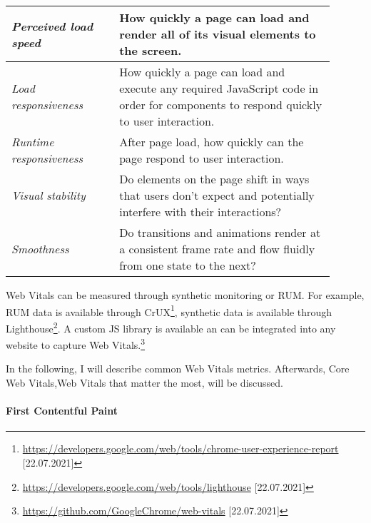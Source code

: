 
\begin{center}
\small
	\begin{tabular}{  p{0.3\linewidth} | p{0.6\linewidth}  }
	\textit{Perceived load speed} & How quickly a page can load and render all of its visual elements to the screen. \\
	\hline
	\textit{Load responsiveness} & How quickly a page can load and execute any required JavaScript code in order for components to respond quickly to user interaction. \\
	\hline
	\textit{Runtime responsiveness} & After page load, how quickly can the page respond to user interaction. \\
	\hline
	\textit{Visual stability} & Do elements on the page shift in ways that users don't expect and potentially interfere with their interactions? \\
	\hline
	\textit{Smoothness} & Do transitions and animations render at a consistent frame rate and flow fluidly from one state to the next? \\
	\end{tabular}
\end{center}



Web Vitals can be measured through synthetic monitoring or RUM. %
For example, RUM data is available through CrUX\footnote{\url{https://developers.google.com/web/tools/chrome-user-experience-report} [22.07.2021]}, synthetic data is available through Lighthouse\footnote{\url{https://developers.google.com/web/tools/lighthouse} [22.07.2021]}.
A custom JS library is available an can be integrated into any website to capture Web Vitals.\footnote{\url{https://github.com/GoogleChrome/web-vitals} [22.07.2021]}




In the following, I will describe common Web Vitals metrics.
Afterwards, Core Web Vitals,Web Vitals that matter the most, will be discussed.





\paragraph{First Contentful Paint}

